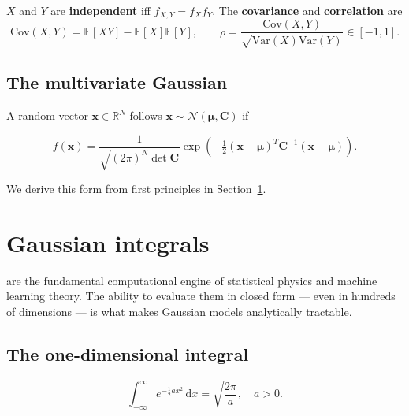 \documentclass[justified,notoc]{tufte-handout}
\def\d{\mathrm{d}}
\def\E{\mathbb{E}}
\def\N{\mathcal{N}}
\def\var{\mathrm{Var}}
\renewcommand{\vec}[1]{\mathbf{#1}}
\begin{document}
$X$ and $Y$ are \textbf{independent} iff $f_{X,Y}=f_X f_Y$. The \textbf{covariance} and \textbf{correlation} are
\begin{equation}
  \mathrm{Cov}(X,Y)=\E[XY]-\E[X]\E[Y], \qquad
  \rho=\frac{\mathrm{Cov}(X,Y)}{\sqrt{\var(X)\var(Y)}}\in[-1,1].
\end{equation}

\subsection{The multivariate Gaussian}

A random vector $\vec{x}\in\mathbb{R}^N$ follows $\vec{x}\sim\N(\boldsymbol{\mu},\mathbf{C})$ if
\begin{keyresult}
\begin{equation}
  f(\vec{x})=\frac{1}{\sqrt{(2\pi)^N\det\mathbf{C}}}\exp\!\left(-\tfrac{1}{2}(\vec{x}-\boldsymbol{\mu})^T\mathbf{C}^{-1}(\vec{x}-\boldsymbol{\mu})\right).
  \label{eq:multivariate_gaussian}
\end{equation}
\end{keyresult}
We derive this form from first principles in Section~\ref{sec:gaussian_integrals}.

\section{Gaussian integrals}
\label{sec:gaussian_integrals}

 are the fundamental computational engine of statistical physics and machine learning theory. The ability to evaluate them in closed form — even in hundreds of dimensions — is what makes Gaussian models analytically tractable.

\subsection{The one-dimensional integral}

\begin{keyresult}
\begin{equation}
  \int_{-\infty}^{\infty} e^{-\frac{1}{2}ax^2}\,\d x = \sqrt{\frac{2\pi}{a}}, \quad a>0.
  \label{eq:gauss_1d}
\end{equation}
\end{keyresult}
\end{document}

